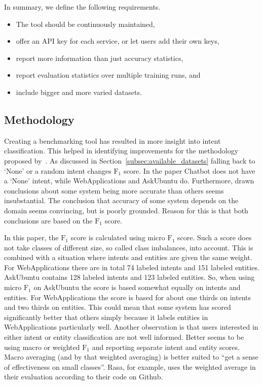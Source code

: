 In summary, we define the following requirements.
\begin{itemize}
    \item The tool should be continuously maintained,
    \item offer an API key for each service, or let users add their own keys,
    \item report more information than just accuracy statistics,
    \item report evaluation statistics over multiple training runs, \hspace*{3mm} and
    \item include bigger and more varied datasets.
\end{itemize}

\subsection{Methodology}
\label{subsec:methodology}
Creating a benchmarking tool has resulted in more insight into intent classification.
This helped in identifying improvements for the methodology proposed by~\citet{braun2017}.
As discussed in Section~\ref{subsec:available_datasets} falling back to `None' or a random intent changes $\text{F}_1$ score.
In the paper Chatbot does not have a `None' intent, while WebApplications and AskUbuntu do.
Furthermore, drawn conclusions about some system being more accurate than others seems insubstantial.
The conclusion that accuracy of some system depends on the domain seems convincing, but is poorly grounded.
Reason for this is that both conclusions are based on the $\text{F}_1$ score.

In this paper, the $\text{F}_1$ score is calculated using micro $\text{F}_1$ score.
Such a score does not take classes of different size, so called class imbalances, into account.
This is combined with a situation where intents and entities are given the same weight.
For WebApplications there are in total 74 labeled intents and 151 labeled entities.
AskUbuntu contains 128 labeled intents and 123 labeled entities.
So, when using micro $\text{F}_1$ on AskUbuntu the score is based somewhat equally on intents and entities.
For WebApplications the score is based for about one thirds on intents and two thirds on entities.
This could mean that some system has scored significantly better that others simply because it labels entities in WebApplications particularly well.
Another observation is that users interested in either intent or entity classification are not well informed.
Better seems to be using macro or weighted $\text{F}_1$ and reporting separate intent and entity scores.
Macro averaging (and by that weighted averaging) is better suited to ``get a sense of effectiveness on small classes''\citep{schutze2008introduction}.
Rasa, for example, uses the weighted average in their evaluation according to their code on Github.

